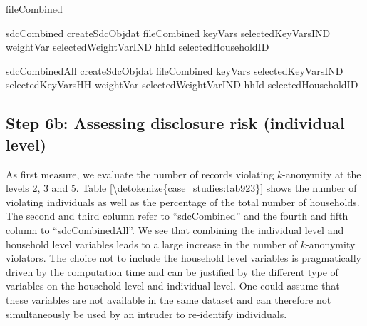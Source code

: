 \documentclass[letterpaper,10pt,english]{sphinxmanual}
\begin{document}
\begin{sphinxVerbatim}[commandchars=\\\{\},numbers=left,firstnumber=1,stepnumber=1]
fileCombined

sdcCombined  createSdcObjdat  fileCombined keyVars  selectedKeyVarsIND
                            weightVar  selectedWeightVarIND hhId  selectedHouseholdID

sdcCombinedAll  createSdcObjdat  fileCombined
                               keyVars  selectedKeyVarsIND selectedKeyVarsHH 
                               weightVar  selectedWeightVarIND hhId  selectedHouseholdID
\end{sphinxVerbatim}


\subsection{Step 6b: Assessing disclosure risk (individual level)}
\label{\detokenize{case_studies:id11}}
As first measure, we evaluate the number of records violating
\(k\)-anonymity at the levels 2, 3 and 5. \hyperref[\detokenize{case_studies:tab923}]{Table \ref{\detokenize{case_studies:tab923}}} shows the
number of violating individuals as well as the percentage of the total
number of households. The second and third column refer to “sdcCombined”
and the fourth and fifth column to “sdcCombinedAll”. We see that
combining the individual level and household level variables leads to a
large increase in the number of \(k\)-anonymity violators. The
choice not to include the household level variables is pragmatically
driven by the computation time and can be justified by the different
type of variables on the household level and individual level. One could
assume that these variables are not available in the same dataset and
can therefore not simultaneously be used by an intruder to re-identify
individuals.
\end{document}
